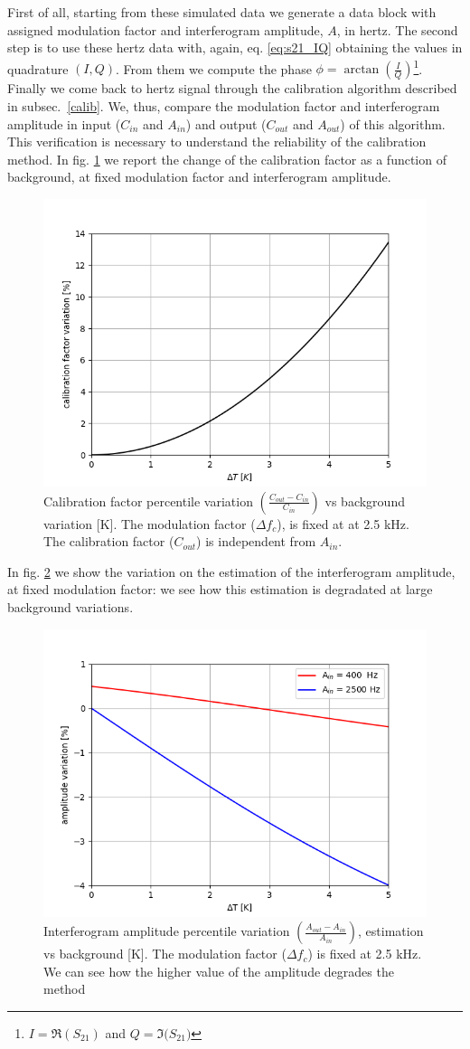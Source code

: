 \documentclass[twocolumn,traditabstract]{aa}\\
\begin{document}
First of all, starting from these simulated data we generate a data block with assigned modulation factor and interferogram amplitude, $A$, in hertz. The second step is to use these hertz data with, again, eq. \ref{eq:s21_IQ} obtaining the values in quadrature $(I,Q)$. From them we compute the phase $\phi=\arctan\left(\frac{I}{Q}\right)$\footnote{ $I = \Re(S_{21})$ and $Q = \Im({S_{21})}$ }. Finally we come back to hertz signal through the calibration algorithm described in subsec.~\ref{calib}. We, thus, compare the modulation factor and interferogram amplitude in input ($C_{in}$ and $A_{in}$) and output ($C_{out}$ and $A_{out}$) of this algorithm. This verification is necessary to understand the reliability of the calibration method. In fig. \ref{fig:cal_bck} we report the change of the calibration factor as a function of background, at fixed modulation factor and interferogram amplitude.

\begin{figure}[htf]
	\centering
	\includegraphics[width=.5\textwidth]{3.acqui/calibration_factor_variation.png}
	\caption{Calibration factor percentile variation $\left( \frac{C_{out}-C_{in}}{C_{in}} \right)$ vs background variation [K]. The modulation factor ($\Delta f_c$), is fixed at at 2.5 kHz. The calibration factor ($C_{out}$) is independent from $A_{in}$.}
	\label{fig:cal_bck}
\end{figure}

\noindent In fig. \ref{fig:amp_bck} we show the variation on the estimation of the interferogram amplitude, at fixed modulation factor: we see how this estimation is degradated at large background variations.

\begin{figure}[htf]
	\centering
	\includegraphics[width=.5\textwidth]{3.acqui/amplitude_variation.png}
	\caption{Interferogram amplitude percentile variation $\left( \frac{A_{out}-A_{in}}{A_{in}} \right)$, estimation vs background [K]. The modulation factor ($\Delta f_c$) is fixed at 2.5 kHz. We can see how the higher value of the amplitude degrades the method}
	\label{fig:amp_bck}
\end{figure}
\end{document}
